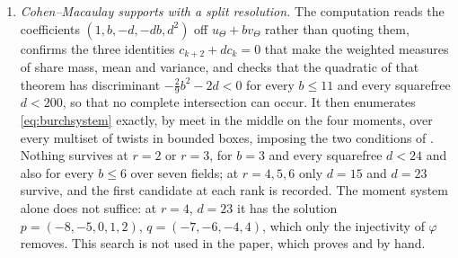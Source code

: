 \begin{enumerate}[label=\textup{(\Roman*)},leftmargin=*]
\item \emph{Cohen--Macaulay supports with a split resolution.} The
  computation reads the coefficients $(1,b,-d,-db,d^{2})$ off $u_{\Theta}+bv_{\Theta}$ rather than quoting them,
  confirms the three identities $c_{k+2}+dc_{k}=0$ that make the weighted
  measures of  share mass, mean and variance, and checks that
  the quadratic of that theorem has discriminant $-\tfrac29b^{2}-2d<0$ for
  every $b\le11$ and every squarefree $d<200$, so that no complete
  intersection can occur. It then enumerates \eqref{eq:burchsystem} exactly,
  by meet in the middle on the four moments, over every multiset of twists in
  bounded boxes, imposing the two conditions of
  . Nothing survives at $r=2$ or $r=3$, for $b=3$ and
  every squarefree $d<24$ and also for every $b\le6$ over seven fields; at
  $r=4,5,6$ only $d=15$ and $d=23$ survive, and the first candidate at each
  rank is recorded. The moment system alone does not suffice: at $r=4$,
  $d=23$ it has the solution $p=(-8,-5,0,1,2)$, $q=(-7,-6,-4,4)$, which only
  the injectivity of $\varphi$ removes. This search is not used in the
  paper, which proves  and  by
  hand.


\end{enumerate}
